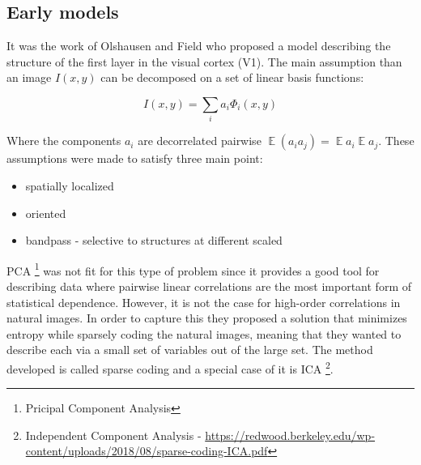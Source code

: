 \documentclass[11pt, english]{article}
\DeclareMathOperator*{\E}{\mathbb{E}}
\begin{document}
\vspace{7mm}

\subsection{Early models}

\vspace{5mm}

\par It was the work of Olshausen and Field \cite{olshausen1996emergence} who proposed a model describing the structure of the first layer in the visual cortex (V1). The main assumption than an image $I(x, y)$ can be decomposed on a set of linear basis functions:

\vspace{3mm}

\begin{equation}
    I(x, y) = \sum_{i}a_i \Phi_{i}(x, y)
\end{equation}

\vspace{3mm}

\par Where the components $a_{i}$ are decorrelated pairwise $\E (a_i a_j) = \E a_i \E a_j$. These assumptions were made to satisfy three main point:

\vspace{3mm}

\begin{itemize}
    \item spatially localized
    \item oriented
    \item bandpass - selective to structures at different scaled
\end{itemize}

\vspace{3mm}

\par PCA \footnote{Pricipal Component Analysis} was not fit for this type of problem since it provides a good tool for describing data where pairwise linear correlations are the most important form of statistical dependence. However, it is not the case for high-order correlations in natural images. In order to capture this they proposed a solution that minimizes entropy while sparsely coding the natural images, meaning that they wanted to describe each via a small set of variables out of the large set. The method developed is called sparse coding and a special case of it is ICA \footnote{Independent Component Analysis - \url{https://redwood.berkeley.edu/wp-content/uploads/2018/08/sparse-coding-ICA.pdf}}.
\end{document}
